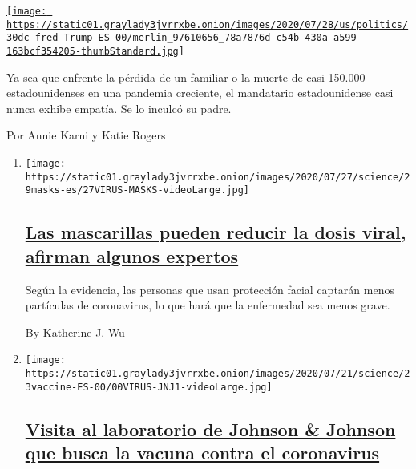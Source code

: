 \begin{enumerate}
\begin{enumerate}
    \href{/es/2020/07/31/espanol/estados-unidos/fred-trump-donald-trump.html}{\texttt{[image: https://static01.graylady3jvrrxbe.onion/images/2020/07/28/us/politics/30dc-fred-Trump-ES-00/merlin\_97610656\_78a7876d-c54b-430a-a599-163bcf354205-thumbStandard.jpg]}}

    Ya sea que enfrente la pérdida de un familiar o la muerte de casi
    150.000 estadounidenses en una pandemia creciente, el mandatario
    estadounidense casi nunca exhibe empatía. Se lo inculcó su padre.

    Por Annie Karni y Katie Rogers
  \end{enumerate}
\end{enumerate}

\begin{enumerate}
\def\labelenumi{\arabic{enumi}.}
\item
  \texttt{[image: https://static01.graylady3jvrrxbe.onion/images/2020/07/27/science/29masks-es/27VIRUS-MASKS-videoLarge.jpg]}

  \hypertarget{las-mascarillas-pueden-reducir-la-dosis-viral-afirman-algunos-expertos}{%
  \subsection{\texorpdfstring{\href{/es/2020/07/29/espanol/ciencia-y-tecnologia/proteccion-cubrebocas-coronavirus.html}{Las
  mascarillas pueden reducir la dosis viral, afirman algunos
  expertos}}{Las mascarillas pueden reducir la dosis viral, afirman algunos expertos}}\label{las-mascarillas-pueden-reducir-la-dosis-viral-afirman-algunos-expertos}}

  Según la evidencia, las personas que usan protección facial captarán
  menos partículas de coronavirus, lo que hará que la enfermedad sea
  menos grave.

  By Katherine J. Wu
\item
  \texttt{[image: https://static01.graylady3jvrrxbe.onion/images/2020/07/21/science/23vaccine-ES-00/00VIRUS-JNJ1-videoLarge.jpg]}

  \hypertarget{visita-al-laboratorio-de-johnson--johnson-que-busca-la-vacuna-contra-el-coronavirus}{%
  \subsection{\texorpdfstring{\href{/es/2020/07/23/espanol/ciencia-y-tecnologia/vacuna-coronavirus.html}{Visita
  al laboratorio de Johnson \& Johnson que busca la vacuna contra el
  coronavirus}}{Visita al laboratorio de Johnson \& Johnson que busca la vacuna contra el coronavirus}}\label{visita-al-laboratorio-de-johnson--johnson-que-busca-la-vacuna-contra-el-coronavirus}}


\end{enumerate}
